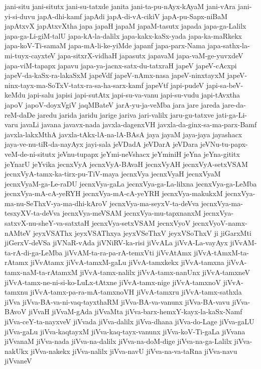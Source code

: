 {jani-situ
jani-situtx
jani-su-tatxde
janita
jani-ta-pu-nAyx-kAyaM
jani-vAra
jani-yi-si-duvu
japA-dhi-kamf
japAdi
japA-di-vA-cikiV
japA-pu-Sapx-niBaM
japAtxvX
japAtxvXtha
japa
japaH
japaM
japaM-tasutx
japada
japa-ga-Lalilx
japa-ga-Li-giM-talU
japa-kA-la-dalilx
japa-kakx-kaSx-yada
japa-ka-maRkekx
japa-koV-Ti-samaM
japa-mA-li-ke-yiMde
japanf
japa-parx-Nama
japa-sathx-la-mi-tuyx-cayxteV
japa-sitxrX-vidhaH
japasutx
japavaM
japa-vaM-ge-yuvxdeV
japa-viM-tapapx
japavu
japa-ya-jacnx-satx-du-tatxraH
japeV
japeV-cAcxpi
japeV-da-kaSx-ra-lakaSxM
japeVdf
japeV-nAmx-nasa
japeV-ninxtayxM
japeV-ninx-tayx-ma-SoTxV-tatx-ra-sa-ha-sarx-kamf
japeVtf
japi-pudeV
japi-sa-beV-keMdu
japi-salu
japisi
japi-sutAtx
japi-su-va-vanu
japi-su-vudu
japi-tAvxtha
japoV
japoV-doyxVgiV
jaqMBateV
jarA-yu-ja-veMba
jara
jare
jareda
jare-da-reM-daDe
jaredu
jarida
jaridu
jarige
jariva
jari-valilx
jaru-gu-tatxve
jati-ga-Li-varu
javaLi
javana
javavx-nada
javxla-dagenxVH
javxla-da-ginx-sa-ma-parx-Bamf
javxla-lakxMthA
javxla-tAkx-lA-na-lA-BAsA
jaya
jayaM
jaya-jaya
jayashacx
jaya-ve-nu-tiR-da-nayAyx
jayi-sala
jeVDadA
jeVDarA
jeVDara
jeVNu-tu-papx-veM-de-ni-situtx
jeVnu-tupapx
jeYmi-neVshacx
jeYminiH
jeYna
jeYna-gititx
jeYnarU
jeYvika
jecnxVyA
jecnxVyA-BAvaH
jecnxVyAH
jecnxVyA-setxVSAM
jecnxVyA-tamx-ka-tirx-pu-TiV-maya
jecnxVya
jecnxVyaH
jecnxVyaM
jecnxVyaM-ga-Le-raDU
jecnxVya-gaLa
jecnxVya-ga-La-lilxna
jecnxVya-ga-LeMba
jecnxVya-mA-cA-yeRYH
jecnxVya-mA-cA-yeYRH
jecnxVya-makukxM
jecnxVya-ma-nu-SeThxV-ya-ma-dhi-kAroV
jecnxVya-ma-seyxV-ta-deVva
jecnxVya-ma-tesxyXV-ta-deVva
jecnxVya-meVSAM
jecnxVya-mu-tapxnanxM
jecnxVya-satxvX-nu-sheY-va-satxtaH
jecnxVya-setxVSAM
jecnxVyoV
jecnxVyoV-namx-nAMteV
jeyxVSAThx
jeyxVSAThxya
jeyxVSeThxV
jeyxVSoThxV
ji
jiGarxMti
jiGerxV-deVSa
jiVNaR-vAda
jiVNiRV-ka-risi
jiVvALa
jiVvA-La-vayAyx
jiVvAM-ta-rA-di-ga-LeMba
jiVvAM-ta-ra-pa-rA-temxVti
jiVvAtAmx
jiVvA-tAmxM-ta-rAtamx
jiVvAtamx
jiVvA-tamxM-gaLu
jiVvA-tamxkekx
jiVvA-tamxna
jiVvA-tamx-naM-ta-rAtamxM
jiVvA-tamx-nalilx
jiVvA-tamx-nanUnx
jiVvA-tamxneV
jiVvA-tamx-ne-ni-si-ko-LuLx-tAtxne
jiVvA-tamx-nige
jiVvA-tamxnoV
jiVvA-tamxnu
jiVvA-tamx-pa-ra-mA-tamxnoVH
jiVvA-tamxru
jiVvA-tamx-sathxla
jiVva
jiVva-BA-va-ni-vaq-tayxthaRM
jiVva-BA-va-vanunx
jiVva-BA-vavu
jiVva-BAvoV
jiVvaH
jiVvaM-gAda
jiVvaMta
jiVva-barx-hemxY-kayx-la-kaSx-Namf
jiVva-ceY-ta-nayxveV
jiVvada
jiVva-dalilx
jiVva-dhana
jiVva-do-Lage
jiVva-gaLU
jiVva-gaLu
jiVva-kaqtayxM
jiVva-kaq-tayx-vanunx
jiVva-koV-Ti-gaLa
jiVvana
jiVvanaM
jiVva-nada
jiVva-na-dalilx
jiVva-na-doM-dige
jiVva-na-ga-Lalilx
jiVva-nakUkx
jiVva-nakekx
jiVva-nalilx
jiVva-navU
jiVva-na-va-taRna
jiVva-navu
jiVvaneV
}
